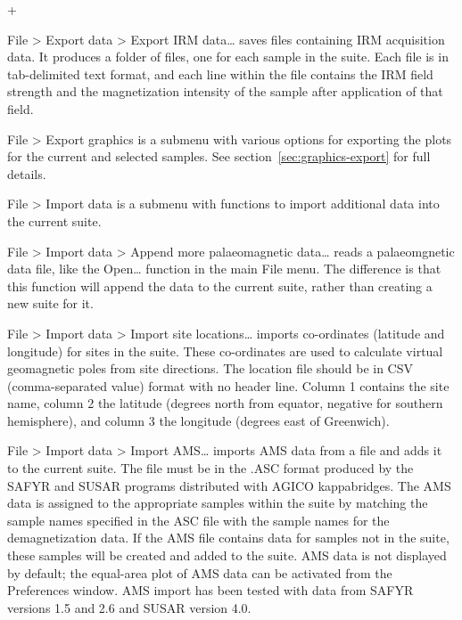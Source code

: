 \documentclass[a4paper,british]{article}
\newcommand{\menuitemlabel}[1]{%
\mbox{\textsf{#1}}\hfil}
\newenvironment{menuitemlist}%
{\begin{list}{}{%
\renewcommand{\makelabel}{\menuitemlabel}%
\setlength{\labelwidth}{35pt}%
\setlength{\leftmargin}%
             {\labelwidth+\labelsep}}}%
{\end{list}}
\newcommand{\ppcmd}[1]{\textsf{#1}} %
\newcommand{\caps}[1]{\MakeTextUppercase{#1}} %
\newcommand{\submenu}{ \textgreater{} } %
\begin{document}
\begin{menuitemlist}
\item[File\submenu Export data\submenu Export IRM data\ldots] saves files
  containing \caps{irm} acquisition data. It produces a folder of files, one
  for each sample in the suite. Each file is in tab-delimited text format,
  and each line within the file contains the \caps{irm} field strength and
  the magnetization intensity of the sample after application of that field.

\item[File\submenu Export graphics] is a submenu with various options
  for exporting the plots for the current and selected samples.
  See section~\ref{sec:graphics-export} for full details.

\item[File\submenu Import data] is a submenu with functions to import
  additional data into the current suite.

\item[File\submenu Import data\submenu Append more palaeomagnetic data\ldots]
  reads a palaeomgnetic data file, like the \ppcmd{Open\ldots} function
  in the main \ppcmd{File} menu. The difference is that this function
  will append the data to the current suite, rather than creating a 
  new suite for it.

\item[File\submenu Import data\submenu Import site locations\ldots]
  imports co-ordinates (latitude and longitude) for sites in the suite.
  These co-ordinates are used to calculate virtual geomagnetic poles
  from site directions. The location file should be in \caps{csv}
  (comma-separated value) format with no header line. Column 1 contains
  the site name, column 2 the latitude (degrees north from equator,
  negative for southern hemisphere), and column 3 the longitude (degrees
  east of Greenwich).

\item[File\submenu Import data\submenu Import AMS\ldots] imports
  \caps{ams} data from a file and adds it to the current suite. The file
  must be in the \caps{.asc} format produced by the \caps{Safyr} and
  \caps{Susar} programs distributed with \caps{Agico} kappabridges. The
  \caps{ams} data is assigned to the appropriate samples within the
  suite by matching the sample names specified in the \caps{asc} file
  with the sample names for the demagnetization data. If the \caps{ams}
  file contains data for samples not in the suite, these samples will be
  created and added to the suite. \caps{Ams} data is not displayed by
  default; the equal-area plot of \caps{ams} data can be activated from
  the \ppcmd{Preferences} window. AMS import has been tested with data
  from \caps{Safyr} versions 1.5 and 2.6 and \caps{Susar} version 4.0.


\end{menuitemlist}
\end{document}
